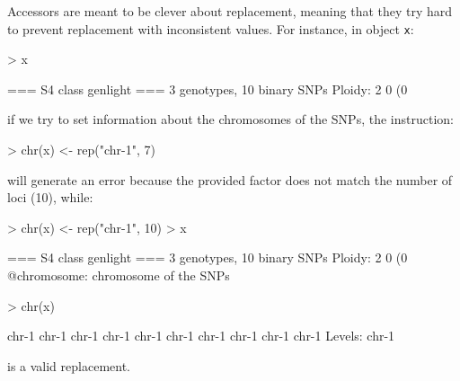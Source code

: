 \documentclass{article}
\begin{document}
Accessors are meant to be clever about replacement, meaning that they try hard to prevent
replacement with inconsistent values. For instance, in object \texttt{x}:
\begin{Schunk}
\begin{Sinput}
> x
\end{Sinput}
\begin{Soutput}
 === S4 class genlight ===
 3 genotypes,  10 binary SNPs
 Ploidy: 2
 0 (0 %) missing data
\end{Soutput}
\end{Schunk}
if we try to set information about the chromosomes of the SNPs, the instruction:
\begin{Schunk}
\begin{Sinput}
> chr(x) <- rep("chr-1", 7)
\end{Sinput}
\end{Schunk}
will generate an error because the provided factor does not match the number of loci (10), while:
\begin{Schunk}
\begin{Sinput}
> chr(x) <- rep("chr-1", 10)
> x
\end{Sinput}
\begin{Soutput}
 === S4 class genlight ===
 3 genotypes,  10 binary SNPs
 Ploidy: 2
 0 (0 %) missing data
 @chromosome: chromosome of the SNPs
\end{Soutput}
\begin{Sinput}
> chr(x)
\end{Sinput}
\begin{Soutput}
 [1] chr-1 chr-1 chr-1 chr-1 chr-1 chr-1 chr-1 chr-1 chr-1 chr-1
Levels: chr-1
\end{Soutput}
\end{Schunk}
is a valid replacement.




\end{document}
